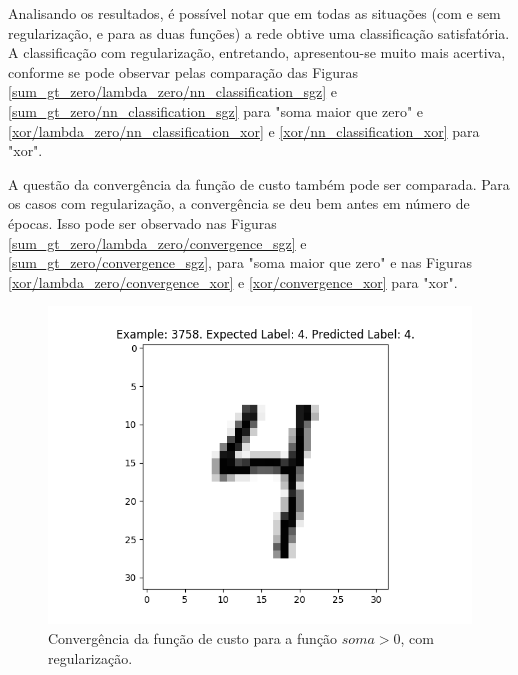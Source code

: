 \documentclass[conference]{IEEEtran}
\begin{document}
Analisando os resultados, é possível notar que em todas as situações (com e sem regularização, e para as duas funções) a rede obtive uma classificação satisfatória. A classificação com regularização, entretando, apresentou-se muito mais acertiva, conforme se pode observar pelas comparação das Figuras \ref{sum_gt_zero/lambda_zero/nn_classification_sgz} e \ref{sum_gt_zero/nn_classification_sgz} para "soma maior que zero" e \ref{xor/lambda_zero/nn_classification_xor} e \ref{xor/nn_classification_xor} para "xor". 

A questão da convergência da função de custo também pode ser comparada. Para os casos com regularização, a convergência se deu bem antes em número de épocas. Isso pode ser observado nas Figuras \ref{sum_gt_zero/lambda_zero/convergence_sgz} e \ref{sum_gt_zero/convergence_sgz}, para "soma maior que zero" e nas Figuras \ref{xor/lambda_zero/convergence_xor} e \ref{xor/convergence_xor} para "xor". 

\begin{figure}[htbp]
\centering
\centerline{\includegraphics[scale=0.5]{imagens/test_image_3758.png}}
\caption{Convergência da função de custo para a função $soma > 0$, com regularização.}
\label{test_image_3758}
\end{figure}
\end{document}
